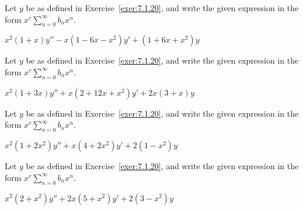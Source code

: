 \documentclass{ximera}
\begin{document}
\begin{problem}\label{exer:7.1.23}
Let $y$ be as defined in Exercise~\ref{exer:7.1.20}, and write the given
expression in the form $x^r\sum_{n=0}^\infty b_nx^n$.

$x^2(1+x)y''-x(1-6x-x^2)y'+(1+6x+x^2)y$
\end{problem}

\begin{problem}\label{exer:7.1.24}
Let $y$ be as defined in Exercise~\ref{exer:7.1.20}, and write the given
expression in the form $x^r\sum_{n=0}^\infty b_nx^n$.

$x^2(1+3x)y''+x(2+12x+x^2)y'+2x(3+x)y$
\end{problem}

\begin{problem}\label{exer:7.1.25}
Let $y$ be as defined in Exercise~\ref{exer:7.1.20}, and write the given
expression in the form $x^r\sum_{n=0}^\infty b_nx^n$.

$x^2(1+2x^2)y''+x(4+2x^2)y'+2(1-x^2)y$
\end{problem}

\begin{problem}\label{exer:7.1.26}
Let $y$ be as defined in Exercise~\ref{exer:7.1.20}, and write the given
expression in the form $x^r\sum_{n=0}^\infty b_nx^n$.

$x^2(2+x^2)y''+2x(5+x^2)y'+2(3-x^2)y$
\end{problem}
\end{document}
